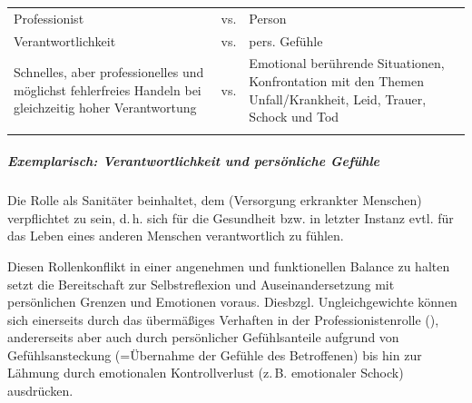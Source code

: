 {\begin{center}
\TableBaseModification
\begin{tabularx}{\linewidth}{XcX}
\toprule\addlinespace
Professionist 
&
vs.
& 
Person 
\\\addlinespace
Verantwortlichkeit 
& 
vs.
& 
pers. Gefühle
\\\addlinespace
Schnelles, aber professionelles und möglichst fehlerfreies
Handeln bei gleichzeitig hoher Verantwortung
&
vs.
&
Emotional berührende Situationen, Konfrontation mit den
Themen Unfall/Krankheit, Leid, Trauer, Schock und Tod
\\\addlinespace\bottomrule
\end{tabularx}
\end{center}



\subparagraph{Exemplarisch: Verantwortlichkeit und
persönliche Gefühle}

Die Rolle als Sanitäter beinhaltet, dem
 (Versorgung erkrankter Menschen) 
verpflichtet zu sein, d.\,h. sich für die Gesundheit bzw. in letzter Instanz evtl. für
das Leben eines anderen Menschen verantwortlich zu fühlen.


Diesen Rollenkonflikt in einer angenehmen und funktionellen
Balance zu halten setzt die Bereitschaft zur Selbstreflexion
und Auseinandersetzung mit persönlichen Grenzen und
Emotionen voraus. Diesbzgl. Ungleichgewichte  können sich
einerseits durch das übermäßiges Verhaften in der
Professionistenrolle (),
andererseits aber auch durch 
persönlicher Gefühlsanteile aufgrund von Gefühlsansteckung (=Übernahme
der Gefühle des Betroffenen) bis hin zur Lähmung  durch
emotionalen Kontrollverlust (z.\,B. emotionaler Schock)
ausdrücken.

}
